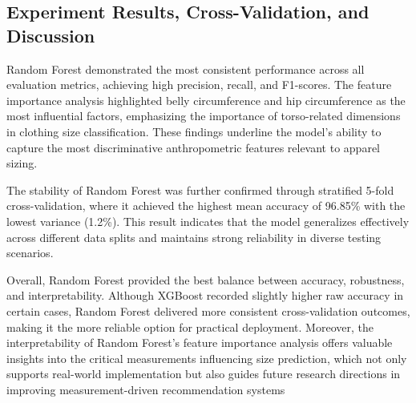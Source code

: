 \documentclass{llncs}
\begin{document}
\subsection{Experiment Results, Cross-Validation, and Discussion}

Random Forest demonstrated the most consistent performance across all evaluation metrics, achieving high precision, recall, and F1-scores. 
The feature importance analysis highlighted belly circumference and hip circumference as the most influential factors, emphasizing the importance of torso-related dimensions in clothing size classification. 
These findings underline the model’s ability to capture the most discriminative anthropometric features relevant to apparel sizing.

The stability of Random Forest was further confirmed through stratified 5-fold cross-validation, where it achieved the highest mean accuracy of 96.85\% with the lowest variance (1.2\%). 
This result indicates that the model generalizes effectively across different data splits and maintains strong reliability in diverse testing scenarios.

Overall, Random Forest provided the best balance between accuracy, robustness, and interpretability. 
Although XGBoost recorded slightly higher raw accuracy in certain cases, Random Forest delivered more consistent cross-validation outcomes, making it the more reliable option for practical deployment. 
Moreover, the interpretability of Random Forest’s feature importance analysis offers valuable insights into the critical measurements influencing size prediction, 
    which not only supports real-world implementation but also guides future research directions in improving measurement-driven recommendation systems
\end{document}
